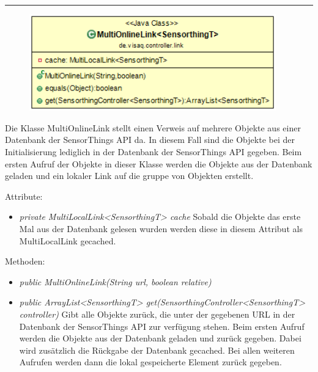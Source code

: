 \rule{\textwidth}{0.4pt}
\begin{minipage}{0.4\textwidth}
    \begin{figure}[H]
        {\centering\includegraphics[width=0.95\textwidth]{media/backend/controller/classes/MultiOnlineLink.png}}
    \end{figure}
    \end{minipage} \hfill
\begin{minipage}{0.6\textwidth}
    Die Klasse MultiOnlineLink stellt einen Verweis auf mehrere Objekte aus einer Datenbank der \gls{SensorThings API} da.
    In diesem Fall sind die Objekte bei der Initialisierung lediglich in der Datenbank der \gls{SensorThings API} gegeben.
    Beim ersten Aufruf der Objekte in dieser Klasse werden die Objekte aus der Datenbank geladen und ein lokaler Link auf die gruppe von Objekten erstellt.
\end{minipage}

Attribute:
\begin{itemize}
    \item \emph{private MultiLocalLink<SensorthingT> cache} Sobald die Objekte das erste Mal aus der Datenbank gelesen wurden werden diese in diesem Attribut als MultiLocalLink gecached.
\end{itemize}
Methoden:
\begin{itemize}
    \item \emph{public MultiOnlineLink(String url, boolean relative)}
    \relativeDescription
    \item \emph{public ArrayList<SensorthingT> get(SensorthingController<SensorthingT> controller)}
    Gibt alle Objekte zurück, die unter der gegebenen URL in der Datenbank der \gls{SensorThings API} zur verfügung stehen.
    Beim ersten Aufruf werden die Objekte aus der Datenbank geladen und zurück gegeben.
    Dabei wird zusätzlich die Rückgabe der Datenbank gecached.
    Bei allen weiteren Aufrufen werden dann die lokal gespeicherte Element zurück gegeben.
\end{itemize}